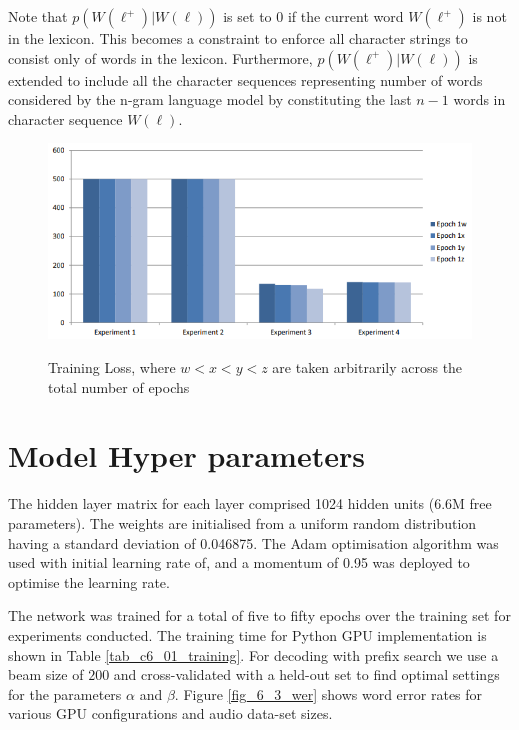 Note that $p(W(\ell^+)|W(\ell))$ is set to $0$ if the current word $W(\ell^+)$ is not in the lexicon. This becomes a constraint to enforce all character strings to consist only of words in the lexicon.  Furthermore,  $p(W(\ell^+)|W(\ell))$ is extended to include all the character sequences representing number of words considered by the n-gram language model by constituting the last $n-1$ words in character sequence $W(\ell)$.

\begin{figure}
\centering
  \includegraphics[width=14cm]{thesis/images/res00.PNG}\\
  \caption{Training Loss, where $w<x<y<z$ are taken arbitrarily across the
total number of epochs} \label{fig_6_2_loss}
\end{figure}

\section{Model Hyper parameters}
The hidden layer matrix for each layer comprised 1024 hidden units (6.6M free parameters).  The weights are initialised from a uniform random distribution having a standard deviation of 0.046875.  The Adam optimisation algorithm \citep{kingma2014adam} was used with initial learning rate of, and a momentum of 0.95 was deployed to optimise the learning rate.

The network was trained for a total of five to fifty epochs over the training set for experiments conducted. The training time for Python GPU implementation is shown in Table \ref{tab_c6_01_training}.  For decoding with prefix search we use a beam size of $200$ and cross-validated with a held-out set to find optimal settings for the parameters $\alpha$ and $\beta$. Figure \ref{fig_6_3_wer} shows word error rates for various GPU configurations and audio data-set sizes.

